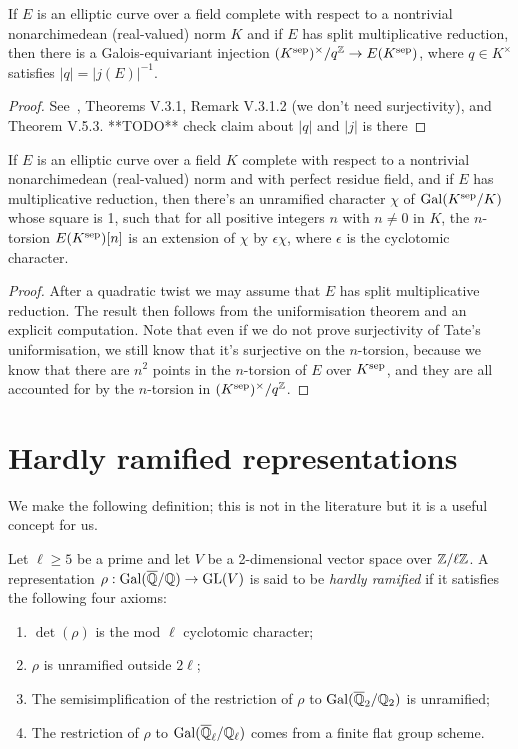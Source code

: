 \begin{theorem}\label{Tate_curve_uniformisation} If $E$ is an elliptic curve over a field
  complete with respect to a nontrivial nonarchimedean (real-valued) norm $K$ and if $E$ has split
  multiplicative reduction, then there is a Galois-equivariant injection
  $(K^{\operatorname{sep}})^\times/q^{\mathbb{Z}}\to E(K^{\operatorname{sep}})$, where $q\in K^\times$ satisfies
  $|q|=|j(E)|^{-1}$.
\end{theorem}
\begin{proof}
  See~\cite{silverman2}, Theorems V.3.1, Remark V.3.1.2 (we don't need surjectivity),
  and Theorem V.5.3. {**TODO** check claim about $|q|$ and $|j|$ is there}
\end{proof}

\begin{corollary}\label{multiplicative_reduction_torsion} If $E$ is an elliptic curve
  over a field $K$ complete with respect to a nontrivial nonarchimedean (real-valued) norm
  and with perfect residue field, and if $E$ has multiplicative reduction, then there's
  an unramified character $\chi$ of $\operatorname{Gal}(K^{\operatorname{sep}}/K)$ whose square is 1, such that for
  all positive integers $n$ with $n\not=0$ in $K$, the 
  $n$-torsion $E(K^{\operatorname{sep}})[n]$ is an extension of $\chi$ by $\epsilon\chi$, where $\epsilon$ is the
  cyclotomic character.
\end{corollary}
\begin{proof} After a quadratic twist we may assume that $E$ has split multiplicative reduction.
  The result then follows from the uniformisation theorem and an explicit computation.
  Note that even if we do not prove surjectivity of Tate's uniformisation, we still know
  that it's surjective on the $n$-torsion, because we know that there are $n^2$ points in the $n$-torsion of $E$ over $K^{\operatorname{sep}}$, and they are all accounted for by the $n$-torsion in $(K^{\operatorname{sep}})^\times/q^{\mathbb{Z}}$.
\end{proof}

\section{Hardly ramified representations}

We make the following definition; this is not in the literature but it is a useful concept for us.

\begin{definition}\label{hardly_ramified} Let $\ell\geq5$ be a prime and let $V$ be a
  2-dimensional vector space over $\mathbb{Z}/\ell\mathbb{Z}$. A representation 
  $\rho: \operatorname{Gal}(\overline{\mathbb{Q}}/\mathbb{Q})\to \operatorname{GL}(V)$ is said to be \emph{hardly ramified} if it satisfies the following four axioms:
  \begin{enumerate}
  \item $\det(\rho)$ is the mod $\ell$ cyclotomic character;
  \item $\rho$ is unramified outside $2\ell$;
  \item The semisimplification of the restriction of $\rho$ to $\operatorname{Gal}(\overline{\mathbb{Q}}_2/\mathbb{Q}_2)$ is unramified;
  \item The restriction of $\rho$ to $\operatorname{Gal}(\overline{\mathbb{Q}}_\ell/\mathbb{Q}_\ell)$ comes from a finite flat group scheme.
  \end{enumerate}
\end{definition}

